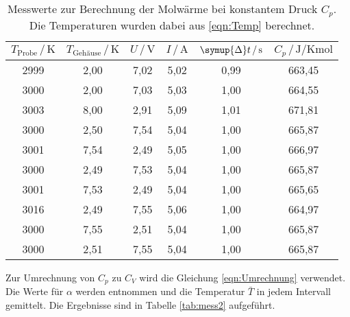 \begin{table}
    \centering
    \caption{Messwerte zur Berechnung der Molwärme bei konstantem Druck $C_p$. Die Temperaturen wurden dabei aus \eqref{eqn:Temp} berechnet.}
    \label{tab:mess1}
    \begin{tabular}{c c c c c c}
    \toprule
    $T_\text{Probe} \,/\, \si{\kelvin}$ & $T_\text{Gehäuse} \,/\, \si{\kelvin}$ & $U \,/\, \si{\volt}$
    & $I \,/\, \si{\ampere}$ & $\symup{\Delta}t \,/\, \si{\second}$
    & $C_p \,/\, \si{\joule\per\kelvin\mole}$\\
    \midrule 
        2999 & 2,00 & 7,02 & 5,02 & 0,99 & 663,45 \\
        3000 & 2,00 & 7,03 & 5,03 & 1,00 & 664,55 \\
        3003 & 8,00 & 2,91 & 5,09 & 1,01 & 671,81 \\
        3000 & 2,50 & 7,54 & 5,04 & 1,00 & 665,87 \\
        3001 & 7,54 & 2,49 & 5,05 & 1,00 & 666,97 \\
        3000 & 2,49 & 7,53 & 5,04 & 1,00 & 665,87 \\
        3001 & 7,53 & 2,49 & 5,04 & 1,00 & 665,65 \\
        3016 & 2,49 & 7,55 & 5,06 & 1,00 & 664,97 \\
        3000 & 7,55 & 2,51 & 5,04 & 1,00 & 665,87 \\
        3000 & 2,51 & 7,55 & 5,04 & 1,00 & 665,87 \\
    \bottomrule
    \end{tabular}
\end{table}

Zur Umrechnung von $C_p$ zu $C_V$ wird die Gleichung \eqref{eqn:Umrechnung} verwendet. Die Werte für $\alpha$ werden \cite{Anleitung} entnommen und die 
Temperatur $\bar{T}$ in jedem Intervall gemittelt. Die Ergebnisse sind in Tabelle \ref{tab:mess2} aufgeführt.


